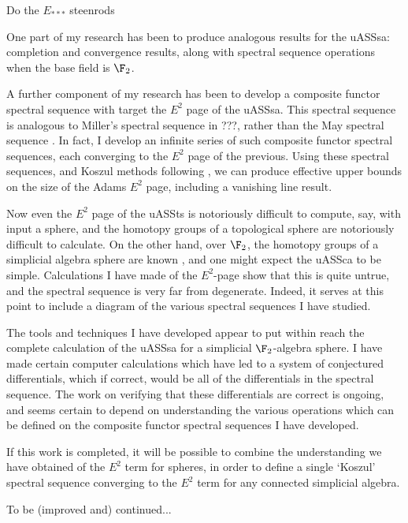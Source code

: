 \documentclass[11pt]{article}
\begin{document}
Do the $E_{***}$ steenrods

\pagebreak

One part of my research has been to produce analogous results for the uASSsa: completion and convergence results, along with spectral sequence operations when the base field is $\F_2$.

A further component of my research has been to develop a composite functor spectral sequence with target the $E^2$ page of the uASSsa. This spectral sequence is analogous to Miller's spectral sequence in ???, rather than the May spectral sequence \cite{MayRestLie.pdf}. In fact, I develop an infinite series of such composite functor spectral sequences, each converging to the $E^2$ page of the previous. Using these spectral sequences, and Koszul methods following \cite{PriddyKoszul.pdf}, we can produce effective upper bounds on the size of the Adams $E^2$ page, including a vanishing line result.

Now even the $E^2$ page of the uASSts is notoriously difficult to compute, say, with input a sphere, and the homotopy groups of a topological sphere are notoriously difficult to calculate. On the other hand, over $\F_2$, the homotopy groups of a simplicial algebra sphere are known \cite{DwyerHtpyOpsSimpComAlg.pdf}, and one might expect the uASSca to be simple. Calculations I have made of the $E^2$-page show that this is quite untrue, and the spectral sequence is very far from degenerate. Indeed, it serves at this point to include a diagram of the various spectral sequences I have studied.

The tools and techniques I have developed appear to put within reach the complete calculation of the uASSsa for a simplicial $\F_2$-algebra sphere. I have made certain computer calculations which have led to a system of conjectured differentials, which if correct, would be all of the differentials in the spectral sequence. The work on verifying that these differentials are correct is ongoing, and seems certain to depend on understanding the various operations which can be defined on the composite functor spectral sequences I have developed.

If this work is completed, it will be possible to combine the understanding we have obtained of the $E^2$ term for spheres, in order to define a single `Koszul' spectral sequence converging to the $E^2$ term for any connected simplicial algebra.

To be (improved and) continued...
\end{document}
